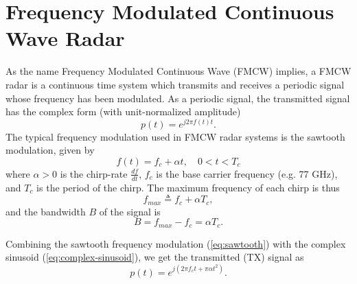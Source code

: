\chapter{Frequency Modulated Continuous Wave Radar}
As the name Frequency Modulated Continuous Wave (FMCW) implies, a FMCW radar is
a continuous time system which transmits and receives a periodic signal whose 
frequency has been modulated. As a periodic signal, the transmitted signal has
the complex form (with unit-normalized amplitude)
\begin{equation}
	\label{eq:complex-sinusoid}
	p(t) = e^{j2\pi f(t)t}.
\end{equation}
The typical frequency modulation used in FMCW radar systems is the sawtooth
modulation, given by
\cite{iovescufundamentals, wang2008digital}
\begin{equation}
	\label{eq:sawtooth}
	f(t) = f_c + \alpha t, \quad 0<t<T_c 
\end{equation}
where $\alpha > 0$ is the chirp-rate  $\frac{df}{dt}$, $f_c$ is the base
carrier frequency (e.g. 77 GHz), and $T_c$ is the period of the chirp. The
maximum frequency of each chirp is thus
\begin{equation}
	f_{max} \triangleq f_c + \alpha T_c,
\end{equation}
and the bandwidth $B$ of the signal is
\begin{equation}
	B = f_{max} - f_c = \alpha T_c.
\end{equation}

Combining the sawtooth frequency modulation (\ref{eq:sawtooth}) with the complex
sinusoid (\ref{eq:complex-sinusoid}), we get
the transmitted (TX) signal as
\begin{equation}
	p(t) = e^{j(2\pi f_c t+ \pi \alpha t^2)}.
\end{equation}

